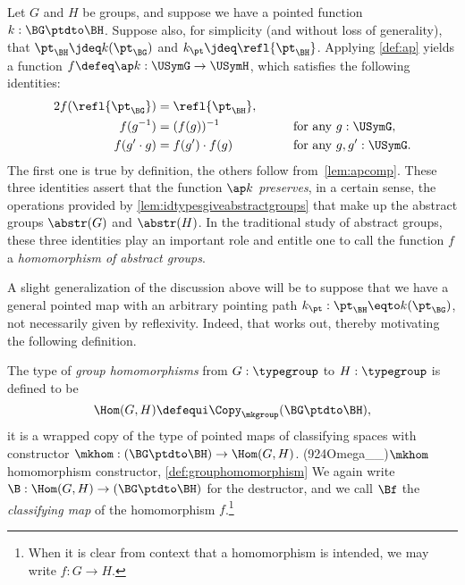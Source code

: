 \begin{remark}\label{rem:homom-eqs}
Let $G$ and $H$ be groups, and suppose we have a pointed function $k : \BG \ptdto \BH$.
Suppose also, for simplicity (and without loss of generality),
that $\pt_\BH \jdeq k ( \pt_\BG ) $ and $k_\pt \jdeq \refl{\pt_\BH}$.
Applying \cref{def:ap} yields a function $f \defeq \ap k : \USymG \to \USymH$, which satisfies the following identities:
\begin{alignat*}2
  f ( \refl {\pt_\BG} ) & = \refl{\pt_\BH},  &\qquad&                            \\
  f (g ^ {-1})     & = (f (g))^{-1}         && \text {for any $g : \USymG$},    \\
  f (g' \cdot g)   & =  f (g') \cdot  f (g) && \text {for any $g, g' : \USymG$}.
\end{alignat*}
The first one is true by definition, the others follow from~\cref{lem:apcomp}.
These three identities assert that the function $\ap k$ \emph{preserves}, in a certain sense, the operations provided by \cref{lem:idtypesgiveabstractgroups} that
make up the abstract groups $\abstr(G)$ and $\abstr(H)$.
In the traditional study of abstract groups, these three identities play an important role and entitle one to call the function $f$ a
\emph{homomorphism of abstract groups}.
\end{remark}

A slight generalization of the discussion above will be to suppose that we have a general pointed map with an arbitrary pointing path
$k_\pt : \pt_\BH \eqto k ( \pt_\BG ) $,
not necessarily given by reflexivity.  Indeed, that works out, thereby motivating the following definition.

\begin{definition}\label{def:grouphomomorphism}
  The type of \emph{group homomorphisms}
  from $G:\typegroup$ to
  $H:\typegroup$ is defined to be
\[
    \Hom(G,H)\defequi\Copy_{\mkgroup}(\BG\ptdto\BH),
  \]
  \ie it is a wrapped copy of the type of pointed maps of classifying spaces
  with constructor
  $\mkhom : (\BG \ptdto \BH) \to \Hom(G,H)$.%
  \glossary(924Omega__){$\protect\mkhom$}{homomorphism constructor, \cref{def:grouphomomorphism}}
  We again write $\B : \Hom(G,H) \to (\BG \ptdto \BH)$ for the destructor,
  and we call $\Bf$ the \emph{classifying map}
  of the homomorphism $f$.\footnote{%
    When it is clear from context that a homomorphism is intended,
    we may write $f : G \to H$.}
\end{definition}

